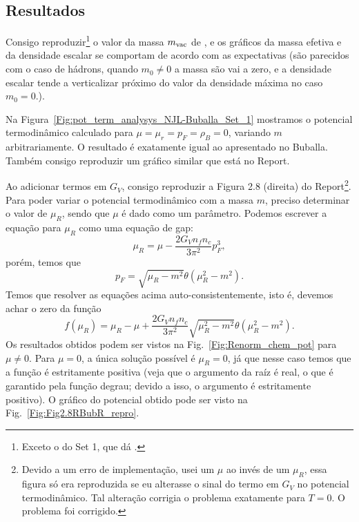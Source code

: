 \subsection{Resultados}

Consigo reproduzir\footnote{Exceto o do Set 1, que dá .} o valor da massa $m_{\rm{vac}}$ de \textcite{Buballa1996}, e os gráficos da massa efetiva e da densidade escalar se comportam de acordo com as expectativas (são parecidos com o caso de hádrons, quando $m_0 \neq 0$ a massa são vai a zero, e a densidade escalar tende a verticalizar próximo do valor da densidade máxima no caso $m_0 = 0$.).

Na Figura~\ref{Fig:pot_term_analysys_NJL-Buballa_Set_1} mostramos o potencial termodinâmico calculado para $\mu = \mu_r = p_F = \rho_B = 0$, variando $m$ arbitrariamente. O resultado é exatamente igual ao apresentado no Buballa. Também consigo reproduzir um gráfico similar que está no Report.

Ao adicionar termos em $G_V$, consigo reproduzir a Figura 2.8 (direita) do Report\footnote{Devido a um erro de implementação, usei um $\mu$ ao invés de um $\mu_R$, essa figura só era reproduzida se eu alterasse o sinal do termo em $G_V$ no potencial termodinâmico. Tal alteração corrigia o problema exatamente para $T = 0$. O problema foi corrigido.}. Para poder variar o potencial termodinâmico com a massa $m$, preciso determinar o valor de $\mu_R$, sendo que $\mu$ é dado como um parâmetro. Podemos escrever a equação para $\mu_R$ como uma equação de gap:
\begin{equation}\label{Eq:Renorm_chem_pot_auto_1}
	\mu_R = \mu - \frac{2G_V n_fn_c}{3\pi^2}p_F^3,
\end{equation}
%
porém, temos que
\begin{equation}\label{Eq:Renorm_chem_pot_auto_2}
	p_F = \sqrt{\mu_R - m^2} \theta(\mu_R^2 - m^2).
\end{equation}
%
Temos que resolver as equações acima auto-consistentemente, isto é, devemos achar o zero da função
\begin{equation}
	f(\mu_R) = \mu_R - \mu + \frac{2G_V n_fn_c}{3\pi^2} \sqrt{\mu_R^2 - m^2}\theta(\mu_R^2 - m^2).
\end{equation}
%
Os resultados obtidos podem ser vistos na Fig.~\ref{Fig:Renorm_chem_pot} para $\mu \neq 0$. Para $\mu = 0$, a única solução possível é $\mu_R = 0$, já que nesse caso temos que a função é estritamente positiva (veja que o argumento da raíz é real, o que é garantido pela função degrau; devido a isso, o argumento é estritamente positivo). O gráfico do potencial obtido pode ser visto na Fig.~\ref{Fig:Fig2.8RBubR_repro}.

